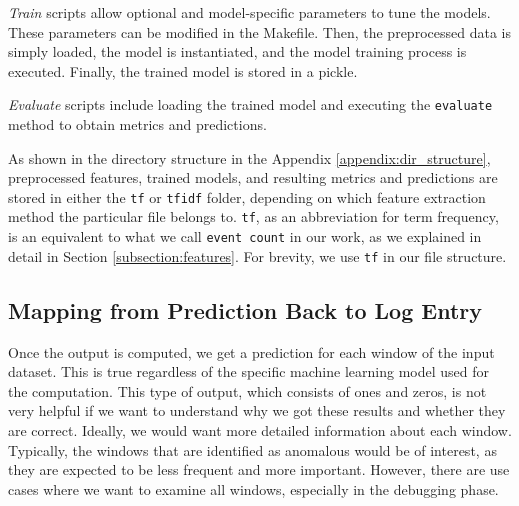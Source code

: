 \textit{Train} scripts allow optional and model-specific parameters to tune the models. These parameters can be modified in the Makefile. Then, the preprocessed data is simply loaded, the model is instantiated, and the model training process is executed. Finally, the trained model is stored in a pickle. 
 
\textit{Evaluate} scripts include loading the trained model and executing the \texttt{\justify evaluate} method to obtain metrics and predictions.

As shown in the directory structure in the Appendix \ref{appendix:dir_structure}, preprocessed features, trained models, and resulting metrics and predictions are stored in either the \texttt{tf} or \texttt{tfidf} folder, depending on which feature extraction method the particular file belongs to. \texttt{tf}, as an abbreviation for term frequency, is an equivalent to what we call \texttt{event count} in our work, as we explained in detail in Section \ref{subsection:features}. For brevity, we use \texttt{tf} in our file structure.

\subsection{Mapping from Prediction Back to Log Entry}
\label{methodology:mapping-predictions-back}
Once the output is computed, we get a prediction for each window of the input dataset. This is true regardless of the specific machine learning model used for the computation. 
This type of output, which consists of ones and zeros, is not very helpful if we want to understand why we got these results and whether they are correct. Ideally, we would want more detailed information about each window.
Typically, the windows that are identified as anomalous would be of interest, as they are expected to be less frequent and more important. However, there are use cases where we want to examine all windows, especially in the debugging phase. 

